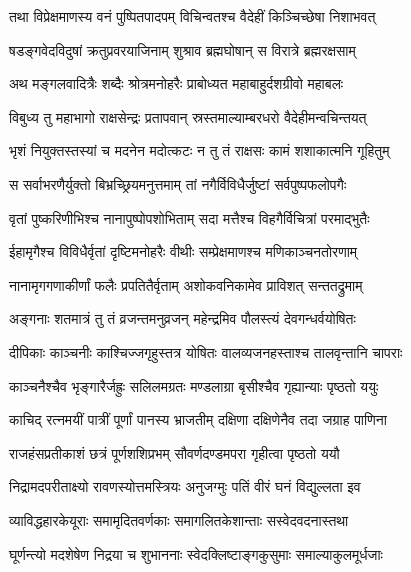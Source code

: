 
\twolineshloka
{तथा विप्रेक्षमाणस्य वनं पुष्पितपादपम्}
{विचिन्वतश्च वैदेहीं किञ्चिच्छेषा निशाभवत्} %

\twolineshloka
{षडङ्गवेदविदुषां क्रतुप्रवरयाजिनाम्}
{शुश्राव ब्रह्मघोषान् स विरात्रे ब्रह्मरक्षसाम्} %

\twolineshloka
{अथ मङ्गलवादित्रैः शब्दैः श्रोत्रमनोहरैः}
{प्राबोध्यत महाबाहुर्दशग्रीवो महाबलः} %

\twolineshloka
{विबुध्य तु महाभागो राक्षसेन्द्रः प्रतापवान्}
{स्रस्तमाल्याम्बरधरो वैदेहीमन्वचिन्तयत्} %

\twolineshloka
{भृशं नियुक्तस्तस्यां च मदनेन मदोत्कटः}
{न तु तं राक्षसः कामं शशाकात्मनि गूहितुम्} %

\twolineshloka
{स सर्वाभरणैर्युक्तो बिभ्रच्छ्रियमनुत्तमाम्}
{तां नगैर्विविधैर्जुष्टां सर्वपुष्पफलोपगैः} %

\twolineshloka
{वृतां पुष्करिणीभिश्च नानापुष्पोपशोभिताम्}
{सदा मत्तैश्च विहगैर्विचित्रां परमाद्भुतैः} %

\twolineshloka
{ईहामृगैश्च विविधैर्वृतां दृष्टिमनोहरैः}
{वीथीः सम्प्रेक्षमाणश्च मणिकाञ्चनतोरणाम्} %

\twolineshloka
{नानामृगगणाकीर्णां फलैः प्रपतितैर्वृताम्}
{अशोकवनिकामेव प्राविशत् सन्ततद्रुमाम्} %

\twolineshloka
{अङ्गनाः शतमात्रं तु तं व्रजन्तमनुव्रजन्}
{महेन्द्रमिव पौलस्त्यं देवगन्धर्वयोषितः} %

\twolineshloka
{दीपिकाः काञ्चनीः काश्चिज्जगृहुस्तत्र योषितः}
{वालव्यजनहस्ताश्च तालवृन्तानि चापराः} %

\twolineshloka
{काञ्चनैश्चैव भृङ्गारैर्जह्रुः सलिलमग्रतः}
{मण्डलाग्रा बृसीश्चैव गृह्यान्याः पृष्ठतो ययुः} %

\twolineshloka
{काचिद् रत्नमयीं पात्रीं पूर्णां पानस्य भ्राजतीम्}
{दक्षिणा दक्षिणेनैव तदा जग्राह पाणिना} %

\twolineshloka
{राजहंसप्रतीकाशं छत्रं पूर्णशशिप्रभम्}
{सौवर्णदण्डमपरा गृहीत्वा पृष्ठतो ययौ} %

\twolineshloka
{निद्रामदपरीताक्ष्यो रावणस्योत्तमस्त्रियः}
{अनुजग्मुः पतिं वीरं घनं विद्युल्लता इव} %

\twolineshloka
{व्याविद्धहारकेयूराः समामृदितवर्णकाः}
{समागलितकेशान्ताः सस्वेदवदनास्तथा} %

\twolineshloka
{घूर्णन्त्यो मदशेषेण निद्रया च शुभाननाः}
{स्वेदक्लिष्टाङ्गकुसुमाः समाल्याकुलमूर्धजाः} %

